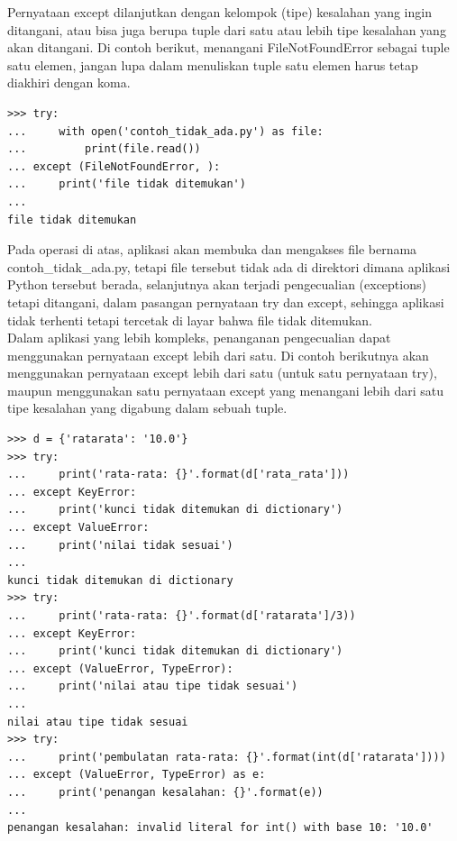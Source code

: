 Pernyataan except dilanjutkan dengan kelompok (tipe) kesalahan yang ingin ditangani, atau bisa juga berupa tuple dari satu atau lebih tipe kesalahan yang akan ditangani. Di contoh berikut, menangani FileNotFoundError sebagai tuple satu elemen, jangan lupa dalam menuliskan tuple satu elemen harus tetap diakhiri dengan koma.\\
\begin{verbatim}
>>> try:
...     with open('contoh_tidak_ada.py') as file:                   
...         print(file.read())                          
... except (FileNotFoundError, ):
...     print('file tidak ditemukan')
...  
file tidak ditemukan
\end{verbatim}

Pada operasi di atas, aplikasi akan membuka dan mengakses file bernama contoh\_tidak\_ada.py, tetapi file tersebut tidak ada di direktori dimana aplikasi Python tersebut berada, selanjutnya akan terjadi pengecualian (exceptions) tetapi ditangani, dalam pasangan pernyataan try dan except, sehingga aplikasi tidak terhenti tetapi tercetak di layar bahwa file tidak ditemukan.\\

Dalam aplikasi yang lebih kompleks, penanganan pengecualian dapat menggunakan pernyataan except lebih dari satu. Di contoh berikutnya akan menggunakan pernyataan except lebih dari satu (untuk satu pernyataan try), maupun menggunakan satu pernyataan except yang menangani lebih dari satu tipe kesalahan yang digabung dalam sebuah tuple.\\

\begin{verbatim}
>>> d = {'ratarata': '10.0'}
>>> try:
...     print('rata-rata: {}'.format(d['rata_rata']))
... except KeyError:                                 
...     print('kunci tidak ditemukan di dictionary')
... except ValueError:              
...     print('nilai tidak sesuai')
...  
kunci tidak ditemukan di dictionary
>>> try:
...     print('rata-rata: {}'.format(d['ratarata']/3))
... except KeyError:                                 
...     print('kunci tidak ditemukan di dictionary')
... except (ValueError, TypeError):
...     print('nilai atau tipe tidak sesuai')
...  
nilai atau tipe tidak sesuai
>>> try:
...     print('pembulatan rata-rata: {}'.format(int(d['ratarata'])))
... except (ValueError, TypeError) as e:         
...     print('penangan kesalahan: {}'.format(e))
...  
penangan kesalahan: invalid literal for int() with base 10: '10.0'
\end{verbatim}

